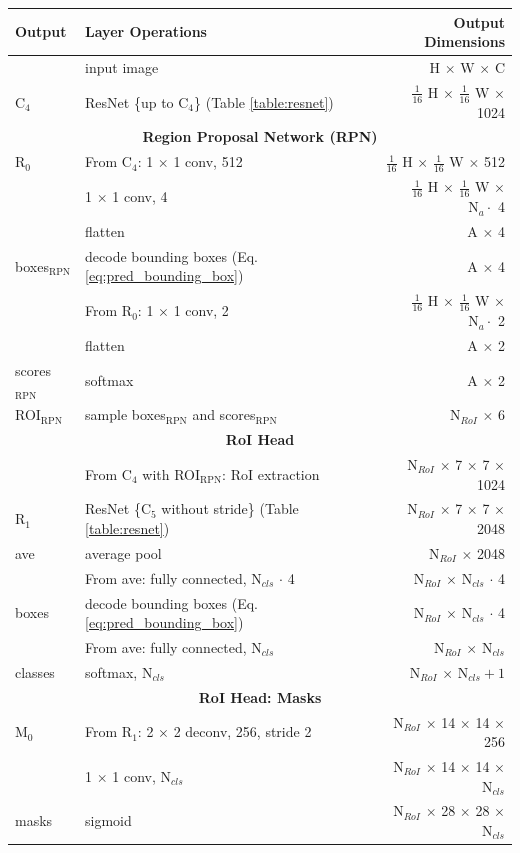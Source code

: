{
\begin{table}[t]
\centering
\begin{tabular}{llr}
\toprule
\textbf{Output} & \textbf{Layer Operations} & \textbf{Output Dimensions} \\
\midrule\midrule
& input image & H $\times$ W $\times$ C \\
\midrule
C$_4$ & ResNet \{up to C$_4$\} (Table \ref{table:resnet})  & $\tfrac{1}{16}$ H $\times$ $\tfrac{1}{16}$ W $\times$ 1024 \\
\midrule
\multicolumn{3}{c}{\textbf{Region Proposal Network (RPN)}}\\
\midrule
R$_0$ & From C$_4$: 1 $\times$ 1 conv, 512 & $\tfrac{1}{16}$ H $\times$ $\tfrac{1}{16}$ W $\times$ 512 \\
& 1 $\times$ 1 conv, 4 & $\tfrac{1}{16}$ H $\times$ $\tfrac{1}{16}$ W $\times$ $\text{N}_a \cdot$ 4 \\
& flatten & A $\times$ 4 \\
boxes$_{\mathrm{RPN}}$ & decode bounding boxes (Eq. \ref{eq:pred_bounding_box}) & A $\times$ 4\\
& From R$_0$: 1 $\times$ 1 conv, 2 & $\tfrac{1}{16}$ H $\times$ $\tfrac{1}{16}$ W $\times$ $\text{N}_a \cdot$ 2 \\
& flatten & A $\times$ 2 \\
scores$_{\mathrm{RPN}}$& softmax & A $\times$ 2 \\
ROI$_{\mathrm{RPN}}$ & sample boxes$_{\mathrm{RPN}}$ and scores$_{\mathrm{RPN}}$ & N$_{RoI}$ $\times$ 6 \\
\midrule
\multicolumn{3}{c}{\textbf{RoI Head}}\\
\midrule
& From C$_4$ with ROI$_{\mathrm{RPN}}$: RoI extraction & N$_{RoI}$ $\times$ 7 $\times$ 7 $\times$ 1024 \\
R$_1$& ResNet \{C$_5$ without stride\} (Table \ref{table:resnet})  & N$_{RoI}$ $\times$ 7 $\times$ 7 $\times$ 2048 \\
ave & average pool & N$_{RoI}$ $\times$ 2048 \\
& From ave: fully connected, N$_{cls}$ $\cdot$ 4 & N$_{RoI}$ $\times$ N$_{cls}$ $\cdot$ 4\\
boxes & decode bounding boxes (Eq. \ref{eq:pred_bounding_box}) & N$_{RoI}$ $\times$ N$_{cls}$ $\cdot$ 4\\
& From ave: fully connected, N$_{cls}$ & N$_{RoI}$ $\times$ N$_{cls}$ \\
classes& softmax, N$_{cls}$ & N$_{RoI}$ $\times$ N$_{cls} + 1$ \\
\midrule
\multicolumn{3}{c}{\textbf{RoI Head: Masks}}\\
\midrule
M$_0$ & From R$_1$: 2 $\times$ 2 deconv, 256, stride 2 & N$_{RoI}$ $\times$ 14 $\times$ 14 $\times$ 256 \\
& 1 $\times$ 1 conv, N$_{cls}$ & N$_{RoI}$ $\times$ 14 $\times$ 14 $\times$ N$_{cls}$ \\
masks & sigmoid & N$_{RoI}$ $\times$ 28 $\times$ 28 $\times$ N$_{cls}$ \\


\end{tabular}
\end{table}}
